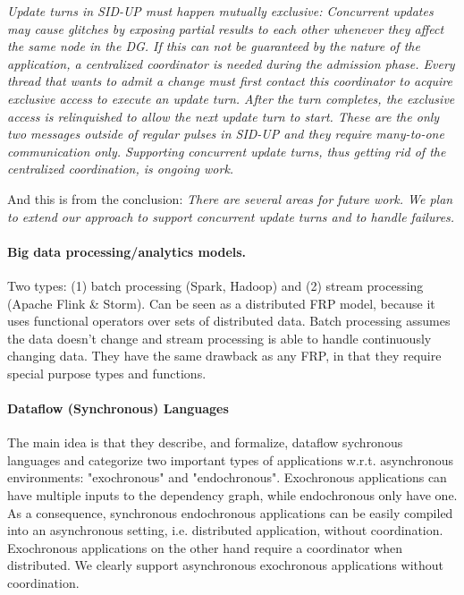 \emph{Update turns in SID-UP must happen mutually exclusive:
Concurrent updates may cause glitches by exposing partial
results to each other whenever they affect the same node in
the DG. If this can not be guaranteed by the nature of the
application, a centralized coordinator is needed during the
admission phase. Every thread that wants to admit a change
must first contact this coordinator to acquire exclusive access
to execute an update turn. After the turn completes, the
exclusive access is relinquished to allow the next update turn
to start. These are the only two messages outside of regular
pulses in SID-UP and they require many-to-one communication
only. Supporting concurrent update turns, thus getting
rid of the centralized coordination, is ongoing work.} \newline

And this is from the conclusion:
\emph{There are several areas for future work. We plan to extend
our approach to support concurrent update turns and to handle
failures.}\newline


\paragraph{Big data processing/analytics models.} Two types: (1) batch processing (Spark, Hadoop) \cite{mapreduce} and (2) stream processing (Apache Flink \& Storm). Can be seen as a  distributed FRP model, because it uses functional operators over sets of distributed data. Batch processing assumes the data doesn't change and stream processing is able to handle continuously changing data. They have the same drawback as any FRP, in that they require special purpose types and functions.


\paragraph{Dataflow (Synchronous) Languages}
\cite{syncdataflow}
The main idea is that they describe, and formalize, dataflow sychronous languages and categorize two important types of applications w.r.t. asynchronous environments: "exochronous" and "endochronous". Exochronous applications can have multiple inputs to the dependency graph, while endochronous only have one. As a consequence, synchronous endochronous applications can be easily compiled into an asynchronous setting, i.e. distributed application, without coordination. Exochronous applications on the other hand require a coordinator when distributed. \newline
We clearly support asynchronous exochronous applications without coordination.

